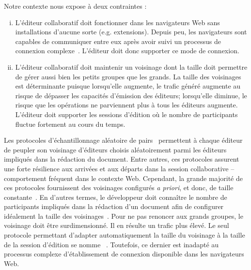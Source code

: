 \noindent Notre contexte nous expose à deux contraintes :

\begin{enumerate}[(i)]
\item L'éditeur collaboratif doit fonctionner dans les navigateurs Web sans
  installations d'aucune sorte (e.g. extensions). Depuis peu, les navigateurs
  sont capables de communiquer entre eux après avoir suivi un processus de
  connexion complexe~\cite{webrtc}. L'éditeur doit donc supporter ce mode de
  connexion.

\item L'éditeur collaboratif doit maintenir un voisinage dont la taille doit
  permettre de gérer aussi bien les petits groupes que les grands.  La taille des
  voisinages est déterminante puisque lorsqu'elle augmente, le trafic généré
  augmente au risque de dépasser les capacités d'émission des éditeurs;
  lorsqu'elle diminue,
  le risque que les opérations ne parviennent plus à tous les éditeurs augmente.
  L'éditeur doit supporter les sessions d'édition où le nombre de participants
  fluctue fortement au cours du temps.
\end{enumerate}

Les protocoles d'échantillonnage aléatoire de pairs~\cite{jelasity2007gossip}
permettent à chaque éditeur de peupler son voisinage d'éditeurs choisis
aléatoirement parmi les éditeurs impliqués dans la rédaction du document. Entre
autres, ces protocoles assurent une forte résilience aux arrivées et aux départs
dans la session collaborative -- comportement fréquent dans le contexte
Web. Cependant, la grande majorité de ces protocoles fournissent des voisinages
configurés \emph{a priori}, et donc, de taille
constante~\cite{eugster2003lightweight, jelasity2007gossip,
  leitao2007dependable, tolgyeski2009adaptive, voulgaris2005cyclon}. En d'autres
termes, le développeur doit connaître le nombre de participants impliqués dans
la rédaction d'un document afin de configurer idéalement la taille des
voisinages~\cite{erdos1959random}.  Pour ne pas renoncer aux grands groupes, le
voisinage doit être surdimensionné. Il en résulte un trafic plus élevé. Le seul
protocole permettant d'adapter automatiquement la taille du voisinage à la
taille de la session d'édition se nomme \SCAMP~\cite{ganesh2003peer}. Toutefois,
ce dernier est inadapté au processus complexe d'établissement de connexion
disponible dans les navigateurs Web.

